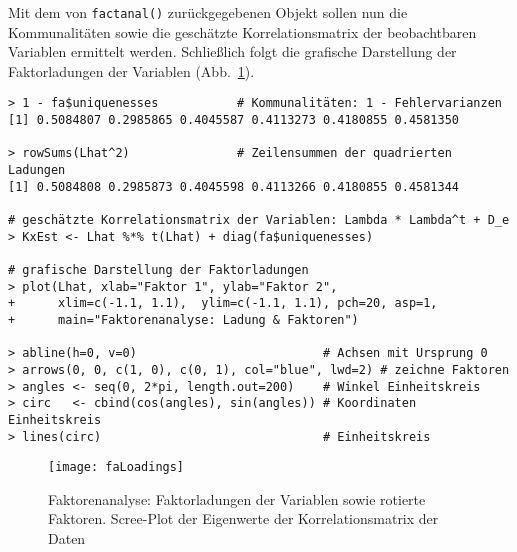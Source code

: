 Mit dem von \lstinline!factanal()! zurückgegebenen Objekt sollen nun die Kommunalitäten sowie die geschätzte Korrelationsmatrix der beobachtbaren Variablen ermittelt werden. Schließlich folgt die grafische Darstellung der Faktorladungen der Variablen (Abb.\ \ref{fig:fa}).
\begin{lstlisting}
> 1 - fa$uniquenesses           # Kommunalitäten: 1 - Fehlervarianzen
[1] 0.5084807 0.2985865 0.4045587 0.4113273 0.4180855 0.4581350

> rowSums(Lhat^2)               # Zeilensummen der quadrierten Ladungen
[1] 0.5084808 0.2985873 0.4045598 0.4113266 0.4180855 0.4581344

# geschätzte Korrelationsmatrix der Variablen: Lambda * Lambda^t + D_e
> KxEst <- Lhat %*% t(Lhat) + diag(fa$uniquenesses)

# grafische Darstellung der Faktorladungen
> plot(Lhat, xlab="Faktor 1", ylab="Faktor 2",
+      xlim=c(-1.1, 1.1),  ylim=c(-1.1, 1.1), pch=20, asp=1,
+      main="Faktorenanalyse: Ladung & Faktoren")

> abline(h=0, v=0)                          # Achsen mit Ursprung 0
> arrows(0, 0, c(1, 0), c(0, 1), col="blue", lwd=2) # zeichne Faktoren
> angles <- seq(0, 2*pi, length.out=200)    # Winkel Einheitskreis
> circ   <- cbind(cos(angles), sin(angles)) # Koordinaten Einheitskreis
> lines(circ)                               # Einheitskreis
\end{lstlisting}

\begin{figure}[ht]
\centering
\texttt{[image: faLoadings]}
\vspace*{-1em}
\caption{Faktorenanalyse: Faktorladungen der Variablen sowie rotierte Faktoren. Scree-Plot der Eigenwerte der Korrelationsmatrix der Daten}
\label{fig:fa}
\end{figure}

